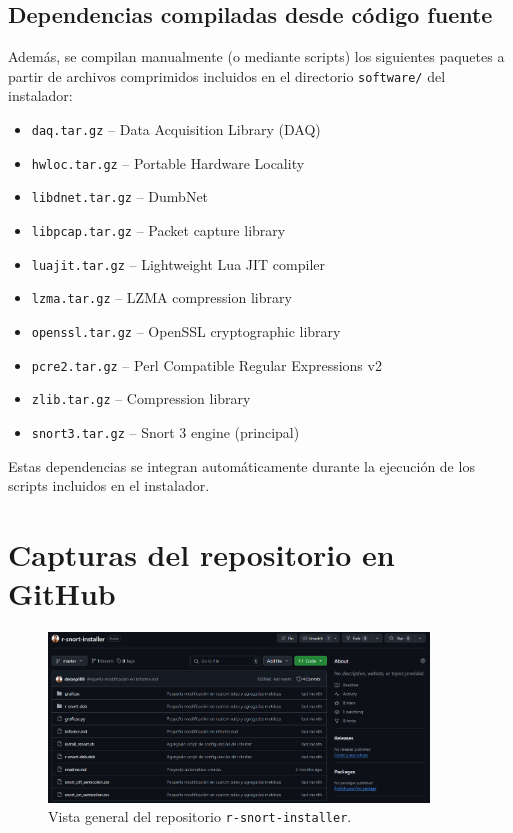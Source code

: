 \documentclass[11pt,a4paper,twoside]{report}
\begin{document}
\pagebreak

\subsection*{Dependencias compiladas desde código fuente}
Además, se compilan manualmente (o mediante scripts) los siguientes paquetes a partir de archivos comprimidos incluidos en el directorio \texttt{software/} del instalador:

\begin{itemize}
	\item \texttt{daq.tar.gz} – Data Acquisition Library (DAQ)
	\item \texttt{hwloc.tar.gz} – Portable Hardware Locality
	\item \texttt{libdnet.tar.gz} – DumbNet
	\item \texttt{libpcap.tar.gz} – Packet capture library
	\item \texttt{luajit.tar.gz} – Lightweight Lua JIT compiler
	\item \texttt{lzma.tar.gz} – LZMA compression library
	\item \texttt{openssl.tar.gz} – OpenSSL cryptographic library
	\item \texttt{pcre2.tar.gz} – Perl Compatible Regular Expressions v2
	\item \texttt{zlib.tar.gz} – Compression library
	\item \texttt{snort3.tar.gz} – Snort 3 engine (principal)
\end{itemize}

Estas dependencias se integran automáticamente durante la ejecución de los scripts incluidos en el instalador.

\section*{Capturas del repositorio en GitHub}

\begin{figure}[H]
	\centering
	\includegraphics[width=0.9\textwidth]{github/1.png}
	\caption{Vista general del repositorio \texttt{r-snort-installer}.}
\end{figure}
\end{document}
